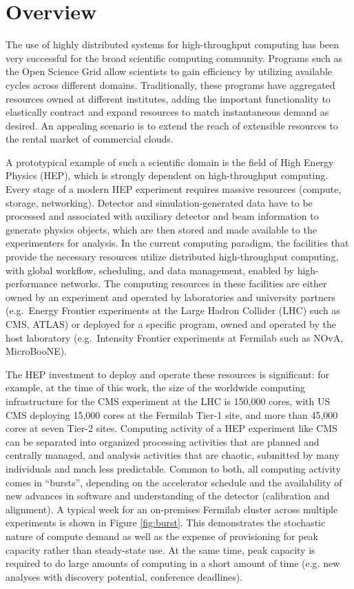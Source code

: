 \documentclass[twocolumn]{svjour3}          %
\begin{document}
\section{\label{sec:introduction}Overview}

The use of highly distributed systems for high-throughput computing has been very successful for the broad scientific computing
community.  Programs such as the Open Science Grid \cite{osg} allow scientists to gain efficiency by utilizing available cycles across different domains. Traditionally, these programs have aggregated resources owned at different institutes, adding
the important functionality to elastically contract and expand resources to match instantaneous demand as desired.
An appealing scenario is to extend the reach
of extensible resources to the rental market of commercial clouds.

A prototypical example of such a scientific domain is the field
of High Energy Physics (HEP), which is strongly dependent on high-throughput computing.
Every stage of a modern HEP experiment requires massive resources (compute, storage, networking). Detector and simulation-generated data have to be processed and associated with auxiliary detector and beam information to generate physics objects, which are then stored and made available to the experimenters for analysis. In the current computing paradigm, the facilities that provide the necessary resources utilize distributed high-throughput computing, with global workflow, scheduling, and data management, enabled by high-performance networks. The computing resources in these facilities are either owned by an experiment and operated by laboratories and university partners
(e.g.\ Energy Frontier experiments at the Large Hadron Collider (LHC) such as CMS, ATLAS) or deployed for a specific program, owned and operated by the host laboratory
(e.g.\ Intensity Frontier experiments at Fermilab such as NOvA, MicroBooNE).

The HEP investment to deploy and operate these resources is significant: for example, at the time of this work, the size of the worldwide computing infrastructure for the CMS experiment at the LHC is 150,000 cores, with US CMS deploying 15,000 cores at the Fermilab Tier-1 site, and more than 45,000 cores at seven Tier-2 sites. 
Computing activity of a HEP experiment like CMS can be separated into organized processing activities that are planned and centrally managed,
and analysis activities that are chaotic, submitted by many individuals and much less predictable. Common to both, all computing activity
comes in ``bursts'', depending on the accelerator schedule and the availability of new advances in software and understanding of the
detector (calibration and alignment). A typical week for an on-premises Fermilab cluster across multiple experiments is shown in Figure \ref{fig:burst}.
This demonstrates the stochastic nature of compute demand
as well as the expense of provisioning for peak capacity rather than steady-state use. At the same time, peak capacity is required to do large amounts of computing
in a short amount of time (e.g. new analyses with discovery potential, conference deadlines).
\end{document}
